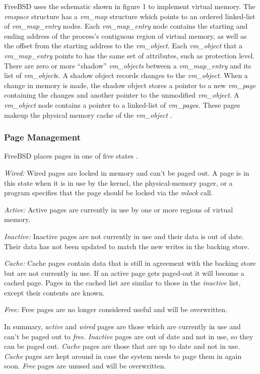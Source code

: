 \documentclass[onecolumn,draftclsnofoot, 10pt, compsoc]{IEEEtran}
\begin{document}
			FreeBSD uses the schematic shown in figure 1 to implement virtual memory.
			The \textit{vmspace} structure has a \textit{vm\_map} structure which points to an ordered linked-list of \textit{vm\_map\_entry} nodes.
			Each \textit{vm\_map\_entry} node contains the starting and ending address of the process's contiguous region of virtual memory, as well as the offset from the starting address to the \textit{vm\_object}.
			Each \textit{vm\_object} that a \textit{vm\_map\_entry} points to has the same set of attributes, such as protection level.
			There are zero or more “shadow” \textit{vm\_objects} between a \textit{vm\_map\_entry} and its list of \textit{vm\_object}s.
			A shadow object records changes to the \textit{vm\_object}.
			When a change in memory is made, the shadow object stores a pointer to a new \textit{vm\_page} containing the changes and another pointer to the unmodified \textit{vm\_object}.
			A \textit{vm\_object} node contains a pointer to a linked-list of \textit{vm\_page}s.
			These pages makeup the physical memory cache of the \textit{vm\_object} \cite{freeBSDMM}. 
			
		\subsubsection{Page Management}
			FreeBSD places pages in one of five states \cite{freeBSDBook}.
			
			\textit{Wired:} Wired pages are locked in memory and can't be paged out.
			A page is in this state when it is in use by the kernel, the physical-memory pager, or a program specifies that the page should be locked via the \textit{mlock} call.
			
			\textit{Active:} Active pages are currently in use by one or more regions of virtual memory.
			
			\textit{Inactive:} Inactive pages are not currently in use and their data is out of date.
			Their data has not been updated to match the new writes in the backing store.
			
			\textit{Cache:} Cache pages contain data that is still in agreement with the backing store but are not currently in use.
			If an active page gets paged-out it will become a cached page.
			Pages in the cached list are similar to those in the \textit{inactive} list, except their contents are known.
	
			\textit{Free:} Free pages are no longer considered useful and will be overwritten.
			
			In summary, \textit{active} and \textit{wired} pages are those which are currently in use and can't be paged out to \textit{free}. 
			\textit{Inactive} pages are out of date and not in use, so they can be paged out.
			\textit{Cache} pages are those that are up to date and not in use.
			\textit{Cache} pages are kept around in case the system needs to page them in again soon.
			\textit{Free} pages are unused and will be overwritten.
	
\end{document}
